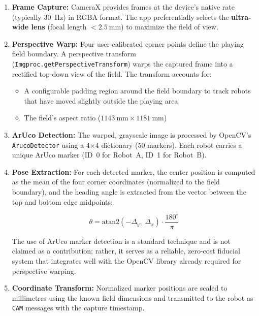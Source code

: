 \documentclass[12pt, a4paper, twoside]{article}
\begin{document}
\begin{enumerate}
    \item \textbf{Frame Capture:} CameraX provides frames at the device's native rate (typically \SI{30}{\hertz}) in RGBA format. The app preferentially selects the \textbf{ultra-wide lens} (focal length $< \SI{2.5}{\milli\metre}$) to maximize the field of view.

    \item \textbf{Perspective Warp:} Four user-calibrated corner points define the playing field boundary. A perspective transform (\texttt{Imgproc.getPerspectiveTransform}) warps the captured frame into a rectified top-down view of the field. The transform accounts for:
    \begin{itemize}
        \item A configurable padding region around the field boundary to track robots that have moved slightly outside the playing area
        \item The field's aspect ratio ($\SI{1143}{\milli\metre} \times \SI{1181}{\milli\metre}$)
    \end{itemize}

    \item \textbf{ArUco Detection:} The warped, grayscale image is processed by OpenCV's \texttt{ArucoDetector} using a 4$\times$4 dictionary (50 markers). Each robot carries a unique ArUco marker (ID~0 for Robot~A, ID~1 for Robot~B).

    \item \textbf{Pose Extraction:} For each detected marker, the center position is computed as the mean of the four corner coordinates (normalized to the field boundary), and the heading angle is extracted from the vector between the top and bottom edge midpoints:

    \begin{equation}
        \theta = \text{atan2}\!\left(-\Delta_y,\; \Delta_x\right) \cdot \frac{180^\circ}{\pi}
    \end{equation}

    The use of ArUco marker detection is a standard technique and is not claimed as a contribution; rather, it serves as a reliable, zero-cost fiducial system that integrates well with the OpenCV library already required for perspective warping.

    \item \textbf{Coordinate Transform:} Normalized marker positions are scaled to millimetres using the known field dimensions and transmitted to the robot as \texttt{CAM} messages with the capture timestamp.
\end{enumerate}
\end{document}
